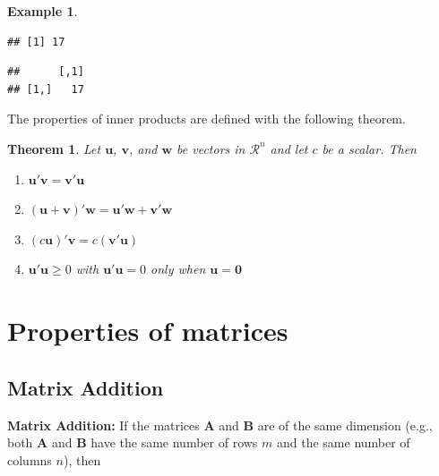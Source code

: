 \documentclass[
]{book}
\newenvironment{Shaded}{\begin{snugshade}}{\end{snugshade}}
\newcommand{\KeywordTok}[1]{\textcolor[rgb]{0.13,0.29,0.53}{\textbf{#1}}}
\newcommand{\NormalTok}[1]{#1}
\newcommand{\OperatorTok}[1]{\textcolor[rgb]{0.81,0.36,0.00}{\textbf{#1}}}
\newcommand{\StringTok}[1]{\textcolor[rgb]{0.31,0.60,0.02}{#1}}
\newtheorem{theorem}{Theorem}[chapter]
\theoremstyle{definition}
\theoremstyle{definition}
\newtheorem{example}{Example}[chapter]
\theoremstyle{definition}
\theoremstyle{definition}
\theoremstyle{remark}
\begin{document}
\begin{example}
\begin{verbatim}
## [1] 17
\end{verbatim}

\begin{Shaded}
\end{Shaded}

\begin{verbatim}
##      [,1]
## [1,]   17
\end{verbatim}

\end{example}

The properties of inner products are defined with the following theorem.

\begin{theorem}

Let \(\mathbf{u}\), \(\mathbf{v}\), and \(\mathbf{w}\) be vectors in \(\mathcal{R}^n\) and let \(c\) be a scalar. Then

\begin{enumerate}
\def\labelenumi{\alph{enumi})}
\item
  \(\mathbf{u}'\mathbf{v} = \mathbf{v}'\mathbf{u}\)
\item
  \((\mathbf{u} + \mathbf{v})' \mathbf{w} = \mathbf{u}' \mathbf{w} + \mathbf{v}' \mathbf{w}\)
\item
  \(( c \mathbf{u} )' \mathbf{v} = c ( \mathbf{v}'\mathbf{u} )\)
\item
  \(\mathbf{u}'\mathbf{u} \geq 0\) with \(\mathbf{u}'\mathbf{u} = 0\) only when \(\mathbf{u} = \mathbf{0}\)
\end{enumerate}

\end{theorem}

\hypertarget{properties-of-matrices}{%
\section{Properties of matrices}\label{properties-of-matrices}}

\hypertarget{matrix-addition}{%
\subsection{Matrix Addition}\label{matrix-addition}}

\textbf{Matrix Addition:} If the matrices \(\mathbf{A}\) and \(\mathbf{B}\) are of the same dimension (e.g., both \(\mathbf{A}\) and \(\mathbf{B}\) have the same number of rows \(m\) and the same number of columns \(n\)), then
\end{document}
